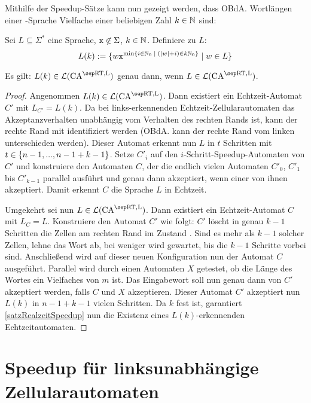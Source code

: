 Mithilfe der Speedup-Sätze kann nun gezeigt werden, dass \acs{OBdA.} Wortlängen einer \CAM{\CART, \CALeft}-Sprache Vielfache einer beliebigen Zahl $k \in \mathbb{N}$ sind:
\begin{satz}
    \label{wrtRealtimeLengthIdeal}
    Sei $L \subseteq \Sigma^*$ eine Sprache, $\texttt{x} \not\in \Sigma$, $k \in \mathbb{N}$.
    Definiere zu $L$:
    \[
        L(k) := \{ { w \texttt{x}^{\min \{ {i \in \mathbb{N}_0 } \; | \; { (|w| + i) \in k\mathbb{N}_0 } \}} } \; | \; { w \in L } \}
    \]
    
    Es gilt: $L(k) \in \CAL{\CART, \CALeft}$ genau dann, wenn $L \in \CAL{\CART, \CALeft}$.
\end{satz}
\begin{proof}
    Angenommen $L(k) \in \CAL{\CART, \CALeft}$.
    Dann existiert ein Echtzeit-Automat $C'$
    mit $L_{C'} = L(k)$.
    Da bei links-erkennenden Echtzeit-Zellularautomaten
    das Akzeptanzverhalten unabhängig vom Verhalten des rechten
    Rands ist, kann der rechte Rand mit  identifiziert werden (\acs{OBdA.} kann der rechte Rand vom linken unterschieden werden).
    Dieser Automat erkennt nun $L$
    in $t$ Schritten mit $t \in \{ {n-1, ..., n-1+k-1} \}$.
    Setze $C'_i$ auf den $i$-Schritt-Speedup-Automaten von $C'$
    und konstruiere den Automaten $C$, der die endlich vielen Automaten
    $C'_0$, $C'_1$ bis $C'_{k-1}$ parallel ausführt und genau
    dann akzeptiert, wenn einer von ihnen akzeptiert.
    Damit erkennt $C$ die Sprache $L$ in Echtzeit.
    
    Umgekehrt sei nun $L \in \CAL{\CART, \CALeft}$.
    Dann existiert ein Echtzeit-Automat $C$
    mit $L_C = L$.
    Konstruiere den Automat $C'$ wie folgt:
    $C'$ löscht in genau $k-1$ Schritten die
    Zellen am rechten Rand im Zustand .
    Sind es mehr als $k-1$ solcher Zellen, lehne das Wort ab, bei weniger
    wird gewartet, bis die $k-1$ Schritte vorbei sind.
    Anschließend wird auf dieser neuen Konfiguration
    nun der Automat $C$ ausgeführt.
    Parallel wird durch einen Automaten $X$ getestet,
    ob die Länge des Wortes ein Vielfaches von $m$ ist.
    Das Eingabewort soll nun genau dann von $C'$ akzeptiert werden,
    falls $C$ und $X$ akzeptieren.
    Dieser Automat $C'$ akzeptiert nun $L(k)$ in $n-1+k-1$
    vielen Schritten.
    Da $k$ fest ist, garantiert \cref{satzRealzeitSpeedup}
    nun die Existenz eines $L(k)$-erkennenden Echtzeitautomaten.
\end{proof}


\section{Speedup für linksunabhängige Zellularautomaten}

